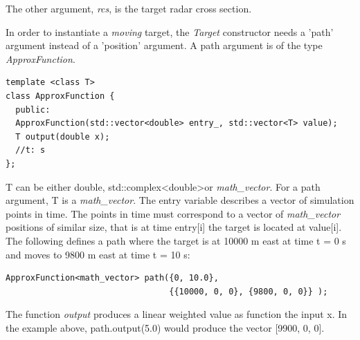 \documentclass[letterpaper]{book}
\begin{document}
The other argument, \textit{rcs}, is the target radar cross section. 

In order to instantiate a \textit{moving} target, the \textit{Target} constructor needs a 'path' argument instead of a 'position' argument. A path argument is of the type \textit{ApproxFunction}. 
\begin{lstlisting}
template <class T>
class ApproxFunction {
  public:
  ApproxFunction(std::vector<double> entry_, std::vector<T> value);
  T output(double x);
  //t: s                    
};
\end{lstlisting}
T can be either double, std::complex\textless double\textgreater or \textit{math\_vector}. For a path argument, T is a \textit{math\_vector}. The entry variable describes a vector of simulation points in time. The points in time must correspond to a vector of \textit{math\_vector} positions of similar size, that is at time entry[i] the target is located at value[i]. The following defines a path where the target is at 10000 m east at time t = 0 s and moves to 9800 m east at time t = 10 s:
\begin{lstlisting}
ApproxFunction<math_vector> path({0, 10.0}, 
                                 {{10000, 0, 0}, {9800, 0, 0}} );
\end{lstlisting}
The function \textit{output} produces a linear weighted value as function the input x. In the example above, path.output(5.0) would produce the vector [9900, 0, 0].
\end{document}
